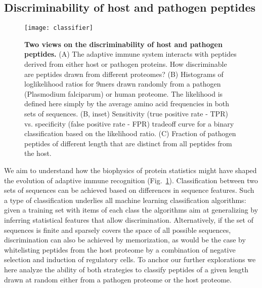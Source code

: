 \documentclass[superscriptaddress,twocolumn,pre]{revtex4}
\newcommand{\<}{\langle}
\renewcommand{\>}{\rangle}
\begin{document}
\subsection{Discriminability of host and pathogen peptides}


\begin{figure}
    \texttt{[image: classifier]}
        \caption{{\bf Two views on the discriminability of host and pathogen peptides.} (A) The adaptive immune system interacts with peptides derived from either host or pathogen proteins. How discriminable are peptides drawn from different proteomes? (B) Histograms of loglikelihood ratios for 9mers drawn randomly from a pathogen (Plasmodium falciparum) or human proteome. The likelihood is defined here simply by the average amino acid frequencies in both sets of sequences. (B, inset) Sensitivity (true positive rate - TPR) vs. specificity (false positive rate - FPR) tradeoff curve for a binary classification based on the likelihood ratio. (C) Fraction of pathogen peptides of different length that are distinct from all peptides from the host.
    \label{figclassifier}
    }
\end{figure}

We aim to understand how the biophysics of protein statistics might have shaped the evolution of adaptive immune recognition (Fig.~\ref{figclassifier}). Classification between two sets of sequences can be achieved based on differences in sequence features. Such a type of classification underlies all machine learning classification algorithms: given a training set with items of each class the algorithms aim at generalizing by inferring statistical features that allow discrimination. Alternatively, if the set of sequences is finite and sparsely covers the space of all possible sequences, discrimination can also be achieved by memorization, as would be the case by whitelisting peptides from the host proteome by a combination of negative selection and induction of regulatory cells. To anchor our further explorations we here analyze the ability of both strategies to classify peptides of a given length drawn at random either from a pathogen proteome or the host proteome.
\end{document}
